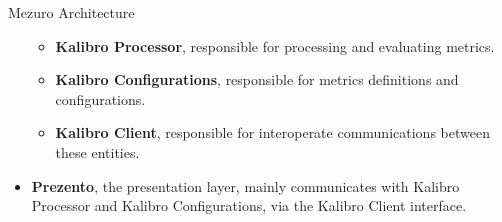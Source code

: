 \begin{block}{Mezuro Architecture}
\begin{itemize}
            \begin{itemize}
                \item \textbf{Kalibro Processor}, responsible for processing and
                    evaluating metrics.
                \item \textbf{Kalibro Configurations}, responsible for metrics
                    definitions and configurations.
                \item \textbf{Kalibro Client}, responsible for interoperate
                    communications between these entities.
            \end{itemize}

        \item \textbf{Prezento}, the presentation layer, mainly communicates with
            Kalibro Processor and Kalibro Configurations, via the Kalibro
            Client interface.
    \end{itemize}
\end{block}
